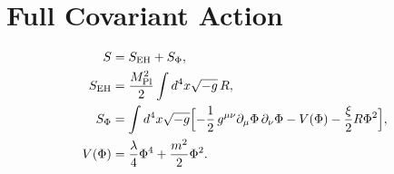 \section{Full Covariant Action}\label{sec:action}

\newcommand{\Mpl}{M_{\mathrm{Pl}}}
\newcommand{\PhiField}{\Phi}

\begin{align}
S &= S_{\text{EH}} + S_{\Phi}, \\
S_{\text{EH}} &= \frac{\Mpl^{2}}{2}\int d^{4}x\sqrt{-g}\,R, \\
S_{\Phi} &= \int d^{4}x\sqrt{-g}\Bigl[
  -\frac12\,g^{\mu\nu}\partial_\mu\PhiField\,\partial_\nu\PhiField
  - V(\PhiField) - \frac{\xi}{2} R\PhiField^{2}
\Bigr], \\
V(\PhiField) &= \frac{\lambda}{4}\PhiField^{4} + \frac{m^{2}}{2}\PhiField^{2}.
\end{align}
